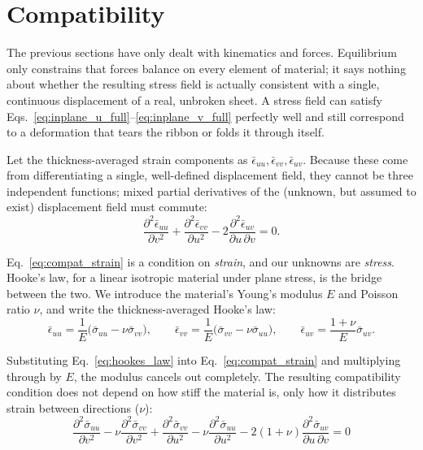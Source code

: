 \documentclass[11pt]{article}
\begin{document}
\section{Compatibility}\label{sec:compatibility}
The previous sections have only dealt with kinematics and forces. Equilibrium only constrains that forces balance on every element of material; it says nothing about whether the resulting stress field is actually consistent with a single, continuous displacement of a real, unbroken sheet. A stress field can satisfy Eqs.~\eqref{eq:inplane_u_full}--\eqref{eq:inplane_v_full} perfectly well and still correspond to a deformation that tears the ribbon or folds it through itself. 

Let the thickness-averaged strain components as $\bar\epsilon_{uu},\bar\epsilon_{vv},\bar\epsilon_{uv}$. Because  these come from differentiating a single, well-defined displacement field, they cannot be three independent functions; mixed partial derivatives of the (unknown, but assumed to exist) displacement field must commute:
\begin{equation}\label{eq:compat_strain}
    \frac{\partial^2\bar\epsilon_{uu}}{\partial v^2}+\frac{\partial^2\bar\epsilon_{vv}}{\partial u^2}-2\frac{\partial^2\bar\epsilon_{uv}}{\partial u\,\partial v}=0.
\end{equation}

Eq.~\eqref{eq:compat_strain} is a condition on \emph{strain}, and our unknowns are \emph{stress}. Hooke's law, for a linear isotropic material under plane stress, is the bridge between the two. We introduce the material's Young's modulus $E$ and Poisson ratio $\nu$, and write the thickness-averaged Hooke's law:
\begin{equation}\label{eq:hookes_law}
    \bar\epsilon_{uu}=\frac1E\big(\bar\sigma_{uu}-\nu\bar\sigma_{vv}\big), \qquad
    \bar\epsilon_{vv}=\frac1E\big(\bar\sigma_{vv}-\nu\bar\sigma_{uu}\big), \qquad
    \bar\epsilon_{uv}=\frac{1+\nu}{E}\bar\sigma_{uv}.
\end{equation}
 
Substituting Eq.~\eqref{eq:hookes_law} into Eq.~\eqref{eq:compat_strain} and multiplying through by $E$, the modulus cancels out completely. The resulting compatibility condition does not depend on how stiff the material is, only how it distributes strain between directions ($\nu$):
\begin{equation}\label{eq:compat_stress_raw}
    \boxed{
    \frac{\partial^2\bar\sigma_{uu}}{\partial v^2}-\nu\frac{\partial^2\bar\sigma_{vv}}{\partial v^2}+\frac{\partial^2\bar\sigma_{vv}}{\partial u^2}-\nu\frac{\partial^2\bar\sigma_{uu}}{\partial u^2}-2(1+\nu)\frac{\partial^2\bar\sigma_{uv}}{\partial u\,\partial v}=0}
\end{equation}
\end{document}

